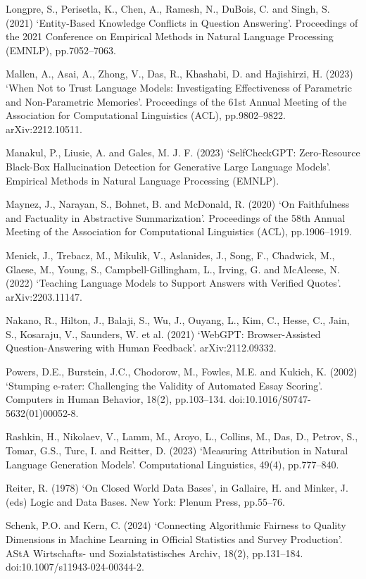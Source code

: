 Longpre, S., Perisetla, K., Chen, A., Ramesh, N., DuBois, C. and Singh, S. (2021) `Entity-Based Knowledge Conflicts in Question Answering'. Proceedings of the 2021 Conference on Empirical Methods in Natural Language Processing (EMNLP), pp.7052--7063.

Mallen, A., Asai, A., Zhong, V., Das, R., Khashabi, D. and Hajishirzi, H. (2023) `When Not to Trust Language Models: Investigating Effectiveness of Parametric and Non-Parametric Memories'. Proceedings of the 61st Annual Meeting of the Association for Computational Linguistics (ACL), pp.9802--9822. arXiv:2212.10511.

Manakul, P., Liusie, A. and Gales, M. J. F. (2023) `SelfCheckGPT: Zero-Resource Black-Box Hallucination Detection for Generative Large Language Models'. Empirical Methods in Natural Language Processing (EMNLP).

Maynez, J., Narayan, S., Bohnet, B. and McDonald, R. (2020) `On Faithfulness and Factuality in Abstractive Summarization'. Proceedings of the 58th Annual Meeting of the Association for Computational Linguistics (ACL), pp.1906--1919.

Menick, J., Trebacz, M., Mikulik, V., Aslanides, J., Song, F., Chadwick, M., Glaese, M., Young, S., Campbell-Gillingham, L., Irving, G. and McAleese, N. (2022) `Teaching Language Models to Support Answers with Verified Quotes'. arXiv:2203.11147.

Nakano, R., Hilton, J., Balaji, S., Wu, J., Ouyang, L., Kim, C., Hesse, C., Jain, S., Kosaraju, V., Saunders, W. et al. (2021) `WebGPT: Browser-Assisted Question-Answering with Human Feedback'. arXiv:2112.09332.

Powers, D.E., Burstein, J.C., Chodorow, M., Fowles, M.E. and Kukich, K. (2002) `Stumping e-rater: Challenging the Validity of Automated Essay Scoring'. Computers in Human Behavior, 18(2), pp.103--134. doi:10.1016/S0747-5632(01)00052-8.

Rashkin, H., Nikolaev, V., Lamm, M., Aroyo, L., Collins, M., Das, D., Petrov, S., Tomar, G.S., Turc, I. and Reitter, D. (2023) `Measuring Attribution in Natural Language Generation Models'. Computational Linguistics, 49(4), pp.777--840.

Reiter, R. (1978) `On Closed World Data Bases', in Gallaire, H. and Minker, J. (eds) Logic and Data Bases. New York: Plenum Press, pp.55--76.

Schenk, P.O. and Kern, C. (2024) `Connecting Algorithmic Fairness to Quality Dimensions in Machine Learning in Official Statistics and Survey Production'. AStA Wirtschafts- und Sozialstatistisches Archiv, 18(2), pp.131--184. doi:10.1007/s11943-024-00344-2.


